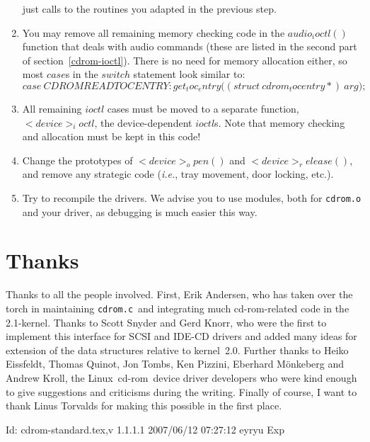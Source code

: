 \documentclass{article}
\def\version{$Id: cdrom-standard.tex,v 1.1.1.1 2007/06/12 07:27:12 eyryu Exp $}
\newcommand{\newsection}[1]{\newpage\section{#1}}
\def\linux{{\sc Linux}}
\def\cdrom{{\sc cd-rom}}
\def\cdromc{{\tt {cdrom.c}}}
\def\fo{\sl}                    %
\def\ie{{\fo i.e.}}
\begin{document}
\begin{enumerate}
  just calls to the routines you adapted in the previous step.
\item You may remove all remaining memory checking code in the
  $audio_ioctl()$ function that deals with audio commands (these are
  listed in the second part of section~\ref{cdrom-ioctl}). There is no
  need for memory allocation either, so most $case$s in the $switch$
  statement look similar to:
  $$
  case\ CDROMREADTOCENTRY\colon get_toc_entry\bigl((struct\ 
  cdrom_tocentry *{})\ arg\bigr);
  $$
\item All remaining $ioctl$ cases must be moved to a separate
  function, $<device>_ioctl$, the device-dependent $ioctl$s. Note that
  memory checking and allocation must be kept in this code!
\item Change the prototypes of $<device>_open()$ and
  $<device>_release()$, and remove any strategic code (\ie, tray
  movement, door locking, etc.).
\item Try to recompile the drivers. We advise you to use modules, both
  for {\tt {cdrom.o}} and your driver, as debugging is much easier this
  way.
\end{enumerate} 

\newsection{Thanks}

Thanks to all the people involved.  First, Erik Andersen, who has
taken over the torch in maintaining \cdromc\ and integrating much
\cdrom-related code in the 2.1-kernel.  Thanks to Scott Snyder and
Gerd Knorr, who were the first to implement this interface for SCSI
and IDE-CD drivers and added many ideas for extension of the data
structures relative to kernel~2.0.  Further thanks to Heiko Eissfeldt,
Thomas Quinot, Jon Tombs, Ken Pizzini, Eberhard M\"onkeberg and Andrew
Kroll, the \linux\ \cdrom\ device driver developers who were kind
enough to give suggestions and criticisms during the writing. Finally
of course, I want to thank Linus Torvalds for making this possible in
the first place.

\vfill
$ \version\ $
\eject
\end{document}
